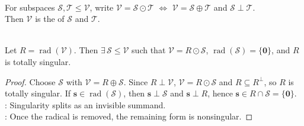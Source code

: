 \begin{definition} \label{def:metric-orthogonal-direct-sum} \\
For subspaces $\mathcal{S},\mathcal{T}\leq\mathcal{V}$, write $\mathcal{V}=\mathcal{S}\odot\mathcal{T}$ $\Longleftrightarrow$ $\mathcal{V}=\mathcal{S}\oplus\mathcal{T}$ and $\mathcal{S}\perp\mathcal{T}$.\\
Then $\mathcal{V}$ is the  of $\mathcal{S}$ and $\mathcal{T}$.
\end{definition}

\begin{theorem} \label{thm:radical-splitting-metric-space} \\
Let $R=\operatorname{rad}(\mathcal{V})$. Then $\exists\,\mathcal{S}\leq\mathcal{V}$ such that $\mathcal{V}=R\odot\mathcal{S}$, $\operatorname{rad}(\mathcal{S})=\{\mathbf{0}\}$, and $R$ is totally singular.
\begin{proof}
Choose $\mathcal{S}$ with $\mathcal{V}=R\oplus\mathcal{S}$. Since $R\perp\mathcal{V}$, $\mathcal{V}=R\odot\mathcal{S}$ and $R\subseteq R^{\perp}$, so $R$ is totally singular. If $\mathbf{s}\in\operatorname{rad}(\mathcal{S})$, then $\mathbf{s}\perp\mathcal{S}$ and $\mathbf{s}\perp R$, hence $\mathbf{s}\in R\cap\mathcal{S}=\{\mathbf{0}\}$.\\
: Singularity splits as an invisible summand.\\
: Once the radical is removed, the remaining form is nonsingular.
\end{proof}
\end{theorem}

